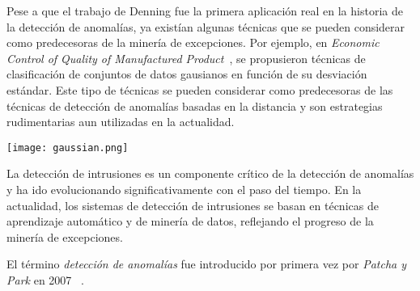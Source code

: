 Pese a que el trabajo de Denning fue la primera aplicación real en la historia de la detección de
anomalías, ya existían algunas técnicas que se pueden considerar como predecesoras de la minería
de excepciones. Por ejemplo, en \textit{Economic Control of Quality of
Manufactured Product}~\cite{shewhart1931economic}, se propusieron técnicas de clasificación de
conjuntos de datos gausianos en función de su desviación estándar. Este tipo de técnicas se pueden
considerar como predecesoras de las técnicas de detección de anomalías basadas en la distancia
y son estrategias rudimentarias aun utilizadas en la actualidad.

\noindent
\begin{minipage}{\linewidth}
	\centering
	\texttt{[image: gaussian.png]}
	\label{fig:fig1}
\end{minipage}
\vspace{1\baselineskip}

La detección de intrusiones es un componente crítico de la detección de anomalías y ha ido evolucionando
significativamente con el paso del tiempo. En la actualidad, los sistemas de detección de intrusiones
se basan en técnicas de aprendizaje automático y de minería de datos, reflejando el progreso de la minería
de excepciones.

El término \textit{detección de anomalías} fue introducido por primera vez por \textit{Patcha y Park} en 2007
~\cite{patcha2007overview}.
